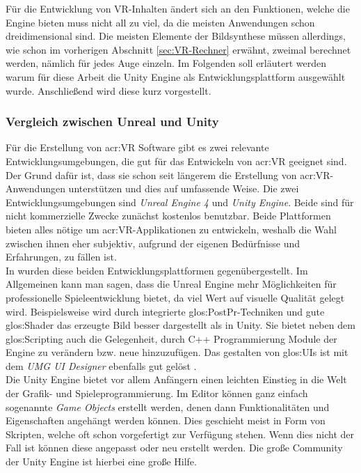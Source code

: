 Für die Entwicklung von VR-Inhalten ändert sich an den Funktionen, welche die Engine bieten muss nicht all zu viel, da die meisten Anwendungen schon dreidimensional sind. Die meisten Elemente der Bildsynthese müssen allerdings, wie schon im vorherigen Abschnitt \ref{sec:VR-Rechner} erwähnt, zweimal berechnet werden, nämlich für jedes Auge einzeln. Im Folgenden soll erläutert werden warum für diese Arbeit die Unity Engine als Entwicklungsplattform ausgewählt wurde. Anschließend wird diese kurz vorgestellt.  

\subsubsection{Vergleich zwischen Unreal und Unity}

Für die Erstellung von \acrlong{acr:VR} Software gibt es zwei relevante Entwicklungsumgebungen, die gut für das Entwickeln von \acrlong{acr:VR} geeignet sind. Der Grund dafür ist, dass sie schon seit längerem die Erstellung von \acrshort{acr:VR}-Anwendungen unterstützen und dies auf umfassende Weise. Die zwei Entwicklungsumgebungen sind \textit{Unreal Engine 4} und \textit{Unity Engine}. Beide sind für nicht kommerzielle Zwecke zunächst kostenlos benutzbar. Beide Plattformen bieten alles nötige um \acrshort{acr:VR}-Applikationen zu entwickeln, weshalb die Wahl zwischen ihnen eher subjektiv, aufgrund der eigenen Bedürfnisse und Erfahrungen, zu fällen ist.\\ 

In \cite{bib:UEvsUE4} wurden diese beiden Entwicklungsplattformen gegenübergestellt. Im Allgemeinen kann man sagen, dass die Unreal Engine mehr Möglichkeiten für professionelle Spieleentwicklung bietet, da viel Wert auf visuelle Qualität gelegt wird. Beispielsweise wird durch integrierte \gls{glos:PostPr}-Techniken und gute \gls{glos:Shader} das erzeugte Bild besser dargestellt als in Unity. Sie bietet neben dem \gls{glos:Scripting} auch die Gelegenheit, durch C++ Programmierung Module der Engine zu verändern bzw. neue hinzuzufügen. Das gestalten von \glspl{glos:UI} ist mit dem \textit{UMG UI Designer} ebenfalls gut gelöst .\\

Die Unity Engine bietet vor allem Anfängern einen leichten Einstieg in die Welt der Grafik- und Spieleprogrammierung. Im Editor können ganz einfach sogenannte \textit{Game Objects} erstellt werden, denen dann Funktionalitäten und Eigenschaften angehängt werden können. Dies geschieht meist in Form von Skripten, welche oft schon vorgefertigt zur Verfügung stehen. Wenn dies nicht der Fall ist können diese angepasst oder neu erstellt werden. Die große Community der Unity Engine ist hierbei eine große Hilfe.

